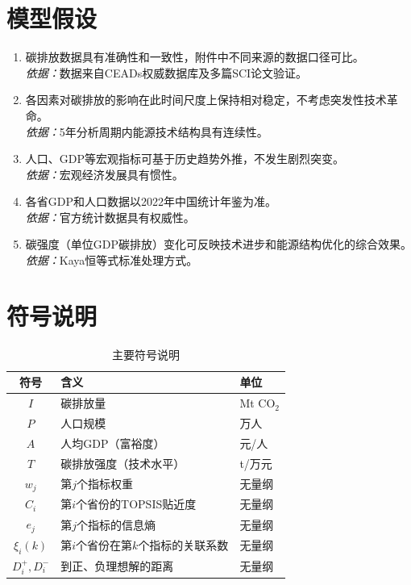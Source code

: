 \documentclass[12pt, a4paper]{article}
\begin{document}
\section{模型假设}

\begin{enumerate}[label=\textbf{假设\arabic*：}, leftmargin=*]
    \item 碳排放数据具有准确性和一致性，附件中不同来源的数据口径可比。\\
    \textit{依据：}数据来自CEADs权威数据库及多篇SCI论文验证。
    \item 各因素对碳排放的影响在此时间尺度上保持相对稳定，不考虑突发性技术革命。\\
    \textit{依据：}5年分析周期内能源技术结构具有连续性。
    \item 人口、GDP等宏观指标可基于历史趋势外推，不发生剧烈突变。\\
    \textit{依据：}宏观经济发展具有惯性。
    \item 各省GDP和人口数据以2022年中国统计年鉴为准。\\
    \textit{依据：}官方统计数据具有权威性。
    \item 碳强度（单位GDP碳排放）变化可反映技术进步和能源结构优化的综合效果。\\
    \textit{依据：}Kaya恒等式标准处理方式\cite{sun2022}。
\end{enumerate}

\section{符号说明}

\begin{table}[H]
\centering
\caption{主要符号说明}
\label{tab:symbols}
\begin{tabular}{cll}
\toprule
\textbf{符号} & \textbf{含义} & \textbf{单位} \\
\midrule
$I$ & 碳排放量 & Mt CO$_2$ \\
$P$ & 人口规模 & 万人 \\
$A$ & 人均GDP（富裕度） & 元/人 \\
$T$ & 碳排放强度（技术水平） & t/万元 \\
$w_j$ & 第$j$个指标权重 & 无量纲 \\
$C_i$ & 第$i$个省份的TOPSIS贴近度 & 无量纲 \\
$e_j$ & 第$j$个指标的信息熵 & 无量纲 \\
$\xi_i(k)$ & 第$i$个省份在第$k$个指标的关联系数 & 无量纲 \\
$D_i^+, D_i^-$ & 到正、负理想解的距离 & 无量纲 \\
\bottomrule
\end{tabular}
\end{table}
\end{document}
